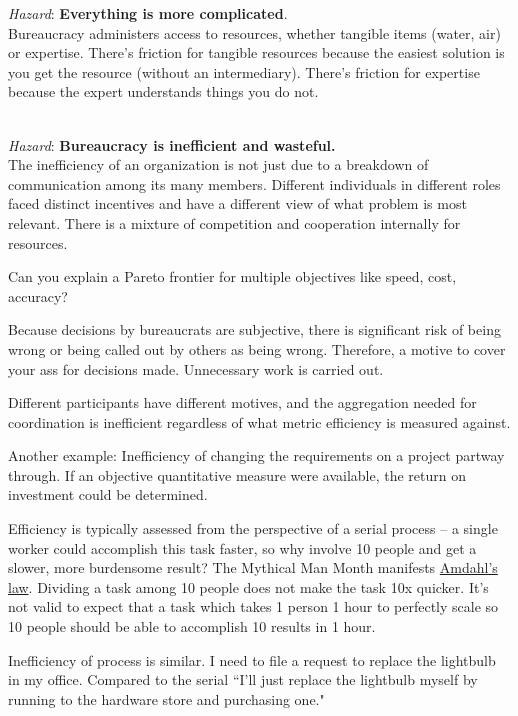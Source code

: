 \begin{samepage}
\textit{Hazard}: \textbf{Everything is more complicated}. \\
Bureaucracy administers access to resources, whether tangible items (water, air) or expertise. There's friction for tangible resources because the easiest solution is you get the resource (without an intermediary). There's friction for expertise because the expert understands things you do not. 
\end{samepage}

\ \\

\textit{Hazard}: \textbf{Bureaucracy is inefficient and wasteful.}\\
The inefficiency of an organization is not just due to a breakdown of communication among its many members. Different individuals in different roles faced distinct incentives and have a different view of what problem is most relevant. There is a mixture of competition and cooperation internally for resources.


Can you explain a Pareto frontier for multiple objectives like speed, cost, accuracy?

Because decisions by bureaucrats are subjective, there is significant risk of being wrong or being called out by others as being wrong. Therefore, a motive to cover your ass for decisions made. Unnecessary work is carried out. 

Different participants have different motives, and the aggregation needed for coordination is inefficient regardless of what metric efficiency is measured against.

Another example: Inefficiency of changing the requirements on a project partway through. If an objective quantitative measure were available, the return on investment could be determined. 

Efficiency is typically assessed from the perspective of a serial process -- a single worker could accomplish this task faster, so why involve 10 people and get a slower, more burdensome result? The Mythical Man Month manifests \href{https://en.wikipedia.org/wiki/Amdahl\%27s_law}{Amdahl's law}. Dividing a task among 10 people does not make the task 10x quicker. It's not valid to expect that a task which takes 1 person 1 hour to perfectly scale so 10 people should be able to accomplish 10 results in 1 hour.

Inefficiency of process is similar. I need to file a request to replace the lightbulb in my office. Compared to the serial ``I'll just replace the lightbulb myself by running to the hardware store and purchasing one."


